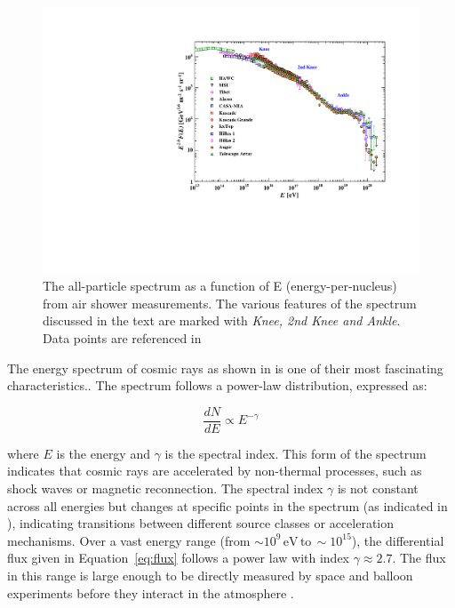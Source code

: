 \begin{figure}[h]
    \caption[The all-particle cosmic-ray flux as a function of the energy per nucleus]{The all-particle spectrum as a function of E (energy-per-nucleus) from air shower measurements. The various features of the spectrum discussed in the text are marked with \emph{Knee, 2nd Knee and Ankle}. Data points are referenced in \cite{PDG2022}}
    \includegraphics{./figures/nu_he/cr_fig8_AllParticle_21.pdf}
\end{figure}

The energy spectrum of cosmic rays as shown in  is one of their most fascinating characteristics.. The spectrum follows a power-law distribution, expressed as:

\begin{equation}\label{eq:flux}
\frac{dN}{dE} \propto E^{-\gamma}
\end{equation}


where \( E \) is the energy and \( \gamma \) is the spectral index. This form of the spectrum indicates that cosmic rays are accelerated by non-thermal processes, such as shock waves or magnetic reconnection. The spectral index \( \gamma \) is not constant across all energies but changes at specific points in the spectrum (as indicated in ), indicating transitions between different source classes or acceleration mechanisms. Over a vast energy range (from $\sim10^9 \, \mathrm{eV} \, \mathrm{to} \, \sim 10^{15} $), the differential flux given in Equation~\ref{eq:flux} follows a power law with index $\gamma\approx2.7$. The flux in this range is large enough to be directly measured by space and balloon experiments before they interact in the atmosphere .

